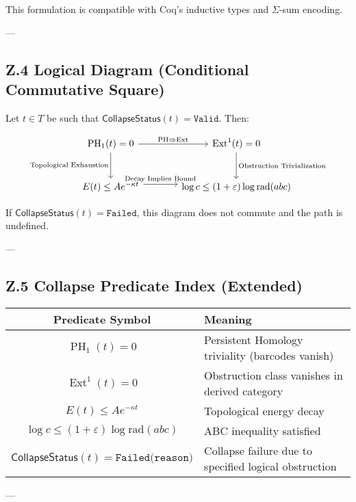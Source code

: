 \documentclass[11pt]{article}
\DeclareMathOperator{\Ext}{Ext}
\DeclareMathOperator{\PH}{PH}
\begin{document}
This formulation is compatible with Coq's inductive types and \( \Sigma \)-sum encoding.

---

\subsection*{Z.4 Logical Diagram (Conditional Commutative Square)}

Let \( t \in T \) be such that \( \mathsf{CollapseStatus}(t) = \texttt{Valid} \). Then:

\[
\begin{tikzcd}[row sep=large, column sep=large]
\PH_1(t) = 0 \arrow[r, "\text{PH} \Rightarrow \Ext"] \arrow[d, swap, "\text{Topological Exhaustion}"]
& \Ext^1(t) = 0 \arrow[d, "\text{Obstruction Trivialization}"] \\
E(t) \leq Ae^{-\kappa t} \arrow[r, "\text{Decay Implies Bound}", yshift=0.7ex]
& \log c \leq (1+\varepsilon)\log \mathrm{rad}(abc)
\end{tikzcd}
\]

If \( \mathsf{CollapseStatus}(t) = \texttt{Failed} \), this diagram does not commute and the path is undefined.

---

\subsection*{Z.5 Collapse Predicate Index (Extended)}

\begin{center}
\begin{tabular}{|c|p{10cm}|}
\hline
\textbf{Predicate Symbol} & \textbf{Meaning} \\
\hline
\( \PH_1(t) = 0 \) & Persistent Homology triviality (barcodes vanish) \\
\hline
\( \Ext^1(t) = 0 \) & Obstruction class vanishes in derived category \\
\hline
\( E(t) \leq Ae^{-\kappa t} \) & Topological energy decay \\
\hline
\( \log c \leq (1+\varepsilon)\log \mathrm{rad}(abc) \) & ABC inequality satisfied \\
\hline
\( \mathsf{CollapseStatus}(t) = \texttt{Failed(reason)} \) & Collapse failure due to specified logical obstruction \\
\hline
\end{tabular}
\end{center}

---
\end{document}
